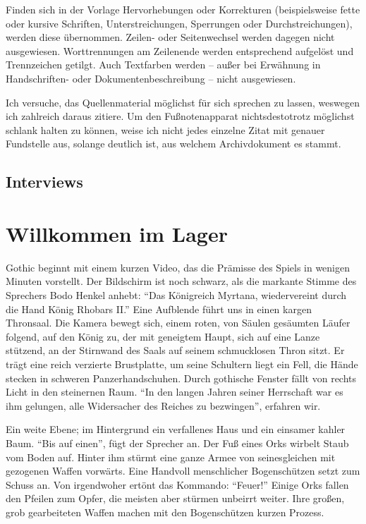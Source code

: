 \documentclass[a5paper,pagesize]{scrbook}
\begin{document}
Finden sich in der Vorlage Hervorhebungen oder Korrekturen (beispielsweise fette oder kursive Schriften, Unterstreichungen, Sperrungen oder Durchstreichungen), werden diese übernommen.
Zeilen- oder Seitenwechsel werden dagegen nicht ausgewiesen.
Worttrennungen am Zeilenende werden entsprechend aufgelöst und Trennzeichen getilgt.
Auch Textfarben werden -- außer bei Erwähnung in Handschriften- oder Dokumentenbeschreibung -- nicht ausgewiesen.

Ich versuche, das Quellenmaterial möglichst für sich sprechen zu lassen, weswegen ich zahlreich daraus zitiere.
Um den Fußnotenapparat nichtsdestotrotz möglichst schlank halten zu können, weise ich nicht jedes einzelne Zitat mit genauer Fundstelle aus, solange deutlich ist, aus welchem Archivdokument es stammt.


\section{Interviews}\label{ch:quellen_interviews}


\mainmatter
\chapter{Willkommen im Lager}\label{ch:willkommen}
Gothic beginnt mit einem kurzen Video, das die Prämisse des Spiels in wenigen Minuten vorstellt.
Der Bildschirm ist noch schwarz, als die markante Stimme des Sprechers Bodo Henkel anhebt:
\enquote{Das Königreich Myrtana, wiedervereint durch die Hand König Rhobars II.}
Eine Aufblende führt uns in einen kargen Thronsaal.
Die Kamera bewegt sich, einem roten, von Säulen gesäumten Läufer folgend, auf den König zu, der mit geneigtem Haupt, sich auf eine Lanze stützend, an der Stirnwand des Saals auf seinem schmucklosen Thron sitzt.
Er trägt eine reich verzierte Brustplatte, um seine Schultern liegt ein Fell, die Hände stecken in schweren Panzerhandschuhen.
Durch gothische Fenster fällt von rechts Licht in den steinernen Raum.
\enquote{In den langen Jahren seiner Herrschaft war es ihm gelungen, alle Widersacher des Reiches zu bezwingen}, erfahren wir.

Ein weite Ebene; im Hintergrund ein verfallenes Haus und ein einsamer kahler Baum.
\enquote{Bis auf einen}, fügt der Sprecher an.
Der Fuß eines Orks wirbelt Staub vom Boden auf.
Hinter ihm stürmt eine ganze Armee von seinesgleichen mit gezogenen Waffen vorwärts.
Eine Handvoll menschlicher Bogenschützen setzt zum Schuss an.
Von irgendwoher ertönt das Kommando: \enquote{Feuer!}
Einige Orks fallen den Pfeilen zum Opfer, die meisten aber stürmen unbeirrt weiter.
Ihre großen, grob gearbeiteten Waffen machen mit den Bogenschützen kurzen Prozess.
\end{document}
